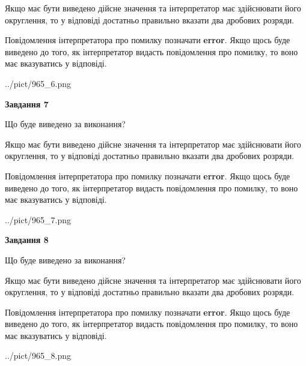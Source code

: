 \documentclass[12pt, ukrainian]{article}
\begin{document}
{\begin {Large}
Якщо має бути виведено дійсне значення та інтерпретатор має здійснювати його округлення, 
то у відповіді достатньо правильно вказати два дробових розряди.

Повідомлення інтерпретатора про помилку позначати \textbf{error}.
Якщо щось буде виведено до того, як інтерпретатор видасть повідомлення про помилку, 
то воно має вказуватись у відповіді. \par

\begin{center}
	{../pict/965_6.png}
\end{center}
\newpage

{\begin {center}\textbf{Завдання 7}\end {center}}\par
Що буде виведено за виконання? \par

Якщо має бути виведено дійсне значення та інтерпретатор має здійснювати його округлення, 
то у відповіді достатньо правильно вказати два дробових розряди.

Повідомлення інтерпретатора про помилку позначати \textbf{error}.
Якщо щось буде виведено до того, як інтерпретатор видасть повідомлення про помилку, 
то воно має вказуватись у відповіді. \par

\begin{center}
	{../pict/965_7.png}
\end{center}
\newpage

{\begin {center}\textbf{Завдання 8}\end {center}}\par
Що буде виведено за виконання? \par

Якщо має бути виведено дійсне значення та інтерпретатор має здійснювати його округлення, 
то у відповіді достатньо правильно вказати два дробових розряди.

Повідомлення інтерпретатора про помилку позначати \textbf{error}.
Якщо щось буде виведено до того, як інтерпретатор видасть повідомлення про помилку, 
то воно має вказуватись у відповіді. \par

\begin{center}
	{../pict/965_8.png}
\end{center}
\newpage


\end{Large}}
\end{document}
